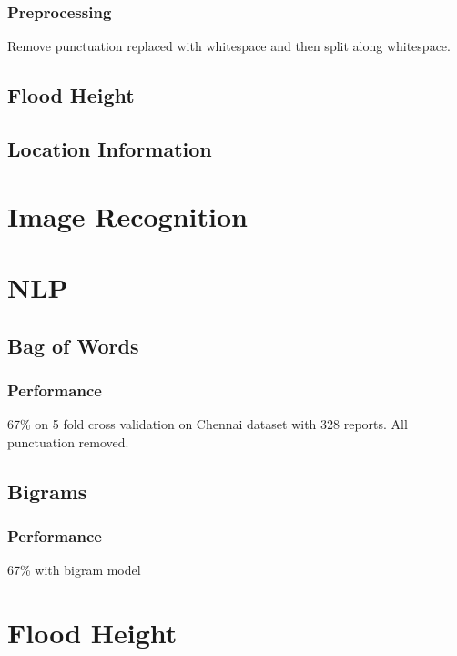 \subsubsection{Preprocessing}
Remove punctuation replaced with whitespace and then split along whitespace.
\subsection{Flood Height}
\subsection{Location Information}

\section{Image Recognition}
\section{NLP}

	\subsection{Bag of Words}
	\subsubsection{Performance}
	67\% on 5 fold cross validation on Chennai dataset with 328 reports. All
	punctuation removed.
		
	\subsection{Bigrams}
	\subsubsection{Performance}
	67\% with bigram model

\section{Flood Height}
